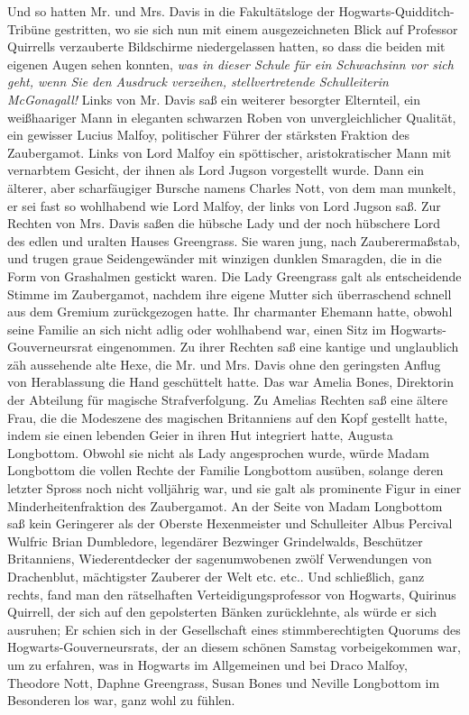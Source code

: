 Und so hatten Mr. und Mrs. Davis in die Fakultätsloge der
Hogwarts-Quidditch-Tribüne gestritten, wo sie sich nun mit einem ausgezeichneten
Blick auf Professor Quirrells verzauberte Bildschirme niedergelassen hatten, so
dass die beiden mit eigenen Augen sehen konnten, \glqq \emph{was in dieser
Schule für ein Schwachsinn vor sich geht, wenn Sie den Ausdruck verzeihen,
stellvertretende Schulleiterin McGonagall!}\grqq{} Links von Mr. Davis saß ein
weiterer besorgter Elternteil, ein weißhaariger Mann in eleganten schwarzen
Roben von unvergleichlicher Qualität, ein gewisser Lucius Malfoy, politischer
Führer der stärksten Fraktion des Zaubergamot. Links von Lord Malfoy ein
spöttischer, aristokratischer Mann mit vernarbtem Gesicht, der ihnen als Lord
Jugson vorgestellt wurde. Dann ein älterer, aber scharfäugiger Bursche namens
Charles Nott, von dem man munkelt, er sei fast so wohlhabend wie Lord Malfoy,
der links von Lord Jugson saß. Zur Rechten von Mrs. Davis saßen die hübsche Lady
und der noch hübschere Lord des edlen und uralten Hauses Greengrass. Sie waren
jung, nach Zauberermaßstab, und trugen graue Seidengewänder mit winzigen dunklen
Smaragden, die in die Form von Grashalmen gestickt waren. Die Lady Greengrass
galt als entscheidende Stimme im Zaubergamot, nachdem ihre eigene Mutter sich
überraschend schnell aus dem Gremium zurückgezogen hatte. Ihr charmanter Ehemann
hatte, obwohl seine Familie an sich nicht adlig oder wohlhabend war, einen Sitz
im Hogwarts-Gouverneursrat eingenommen. Zu ihrer Rechten saß eine kantige und
unglaublich zäh aussehende alte Hexe, die Mr. und Mrs. Davis ohne den geringsten
Anflug von Herablassung die Hand geschüttelt hatte. Das war Amelia Bones,
Direktorin der Abteilung für magische Strafverfolgung. Zu Amelias Rechten saß
eine ältere Frau, die die Modeszene des magischen Britanniens auf den Kopf
gestellt hatte, indem sie einen lebenden Geier in ihren Hut integriert hatte,
Augusta Longbottom. Obwohl sie nicht als Lady angesprochen wurde, würde Madam
Longbottom die vollen Rechte der Familie Longbottom ausüben, solange deren
letzter Spross noch nicht volljährig war, und sie galt als prominente Figur in
einer Minderheitenfraktion des Zaubergamot. An der Seite von Madam Longbottom
saß kein Geringerer als der Oberste Hexenmeister und Schulleiter Albus Percival
Wulfric Brian Dumbledore, legendärer Bezwinger Grindelwalds, Beschützer
Britanniens, Wiederentdecker der sagenumwobenen zwölf Verwendungen von
Drachenblut, mächtigster Zauberer der Welt etc. etc.. Und schließlich, ganz
rechts, fand man den rätselhaften Verteidigungsprofessor von Hogwarts, Quirinus
Quirrell, der sich auf den gepolsterten Bänken zurücklehnte, als würde er sich
ausruhen; Er schien sich in der Gesellschaft eines stimmberechtigten Quorums des
Hogwarts-Gouverneursrats, der an diesem schönen Samstag vorbeigekommen war, um
zu erfahren, was in Hogwarts im Allgemeinen und bei Draco Malfoy, Theodore Nott,
Daphne Greengrass, Susan Bones und Neville Longbottom im Besonderen los war,
ganz wohl zu fühlen.

